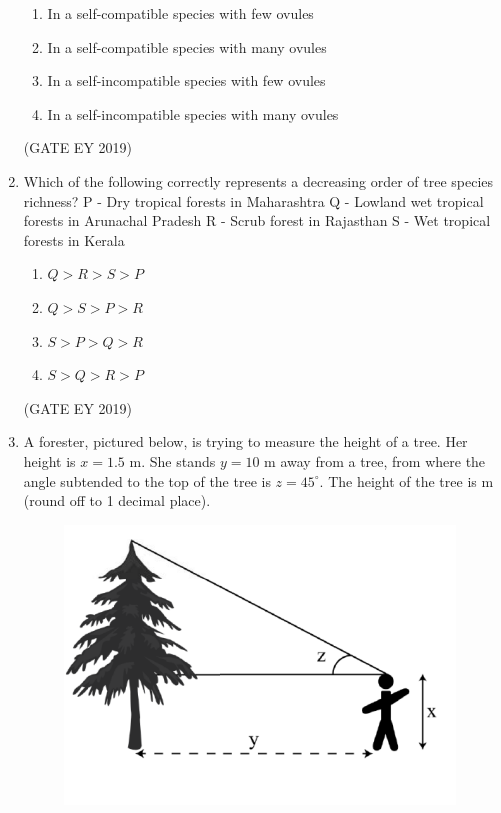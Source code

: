 \documentclass[journal,12pt,onecolumn]{IEEEtran}
\theoremstyle{remark}
\begin{document}
\begin{enumerate}[resume]
\begin{enumerate}
\item In a self-compatible species with few ovules
\item In a self-compatible species with many ovules
\item In a self-incompatible species with few ovules
\item In a self-incompatible species with many ovules
\end{enumerate}

\hfill{(GATE EY 2019)}
\item Which of the following correctly represents a decreasing order of tree species richness?  
P - Dry tropical forests in Maharashtra  
Q  - Lowland wet tropical forests in Arunachal Pradesh  
R - Scrub forest in Rajasthan  
S  - Wet tropical forests in Kerala

\begin{multicols}{2}
\begin{enumerate}
\item $Q > R > S > P$
\item $Q > S > P > R$
\item $S > P > Q > R$
\item $S > Q > R > P$
\end{enumerate}
\end{multicols}
\hfill{(GATE EY 2019)}


\item A forester, pictured below, is trying to measure the height of a tree. Her height is $x=1.5$ m. She stands $y=10$ m away from a tree, from where the angle subtended to the top of the tree is $z=45^\circ$. The height of the tree is \underline{\hspace{1.5cm}} m (round off to 1 decimal place).

\begin{figure}[H]
    \centering
    \includegraphics[]{figs/48.png}
    \caption{}
    \label{fig:12}
\end{figure}


\end{enumerate}
\end{document}
